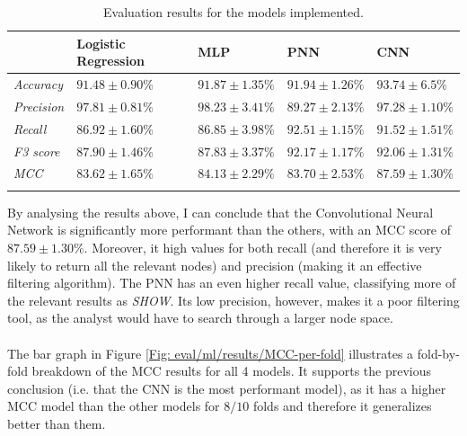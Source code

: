 		\begin{longtable}{|p{}|p{}|p{}|p{}|p{}|}
			\hline
			& \textbf{Logistic Regression} & \textbf{MLP} & \textbf{PNN} &  \textbf{CNN}\\
			\hline
			\textit{Accuracy} & $91.48 \pm 0.90 \%$ &$91.87 \pm 1.35 \%$  &  $91.94 \pm 1.26 \%$ &\cellcolor{green!50}  $\mathbf{93.74 \pm 6.5 \%}$ \\
			\hline
			\textit{Precision} & $97.81 \pm 0.81\%$& $98.23 \pm 3.41 \%$ &   $89.27 \pm 2.13 \%$ & \cellcolor{green!50} $\mathbf{97.28 \pm 1.10 \%}$  \\
			\hline
			\textit{Recall} & $86.92 \pm 1.60\%$& $86.85 \pm 3.98 \%$ & $92.51 \pm 1.15 \%$ & \cellcolor{green!50} $\mathbf{91.52 \pm 1.51 \%}$  \\
			\hline
			\textit{F3 score} & $87.90 \pm 1.46 \%$ & $87.83 \pm 3.37 \%$  &  $92.17 \pm 1.17 \%$ & \cellcolor{green!50} $\mathbf{92.06 \pm 1.31 \%}$\\
			\hline
			\textit{MCC} & $83.62 \pm 1.65\%$& $84.13 \pm 2.29 \%$ &  $83.70 \pm 2.53 \%$ & \cellcolor{green!50} $\mathbf{87.59 \pm 1.30 \%}$\\
			\hline
			\caption{Evaluation results for the models implemented.}
			\label{Table: eval/models/results/overall}
		\end{longtable}
		By analysing the results above, I can conclude that the Convolutional Neural Network is significantly more performant than the others, with an MCC score of $\mathbf{87.59 \pm 1.30 \%}$. Moreover, it high values for both recall (and therefore it is very likely to return all the relevant nodes)  and precision (making it an effective filtering algorithm). The PNN has an even higher recall value, classifying more of the relevant results as \textit{SHOW}. Its low precision, however, makes it a poor filtering tool, as the analyst would have to search through a larger node space.
		\\ \\
		The bar graph in Figure \ref{Fig: eval/ml/results/MCC-per-fold} illustrates a fold-by-fold breakdown of the MCC results for all 4 models. It supports the previous conclusion (i.e. that the CNN is the most performant model), as it has a higher MCC model than the other models for $8/10$ folds and therefore it generalizes better than them.    

